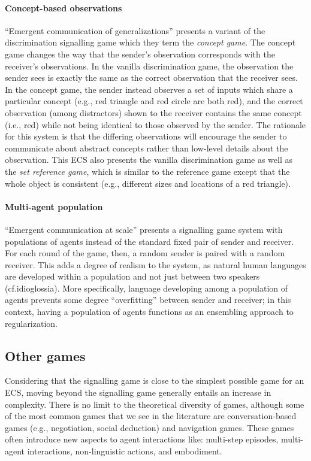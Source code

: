 \paragraph{Concept-based observations}
``Emergent communication of generalizations'' \citep[MIT license]{mu2021generalizations} presents a variant of the discrimination signalling game which they term the \emph{concept game}.
The concept game changes the way that the sender's observation corresponds with the receiver's observations.
In the vanilla discrimination game, the observation the sender sees is exactly the same as the correct observation that the receiver sees.
In the concept game, the sender instead observes a set of inputs which share a particular concept (e.g., red triangle and red circle are both red), and the correct observation (among distractors) shown to the receiver contains the same concept (i.e., red) while not being identical to those observed by the sender.
The rationale for this system is that the differing observations will encourage the sender to communicate about abstract concepts rather than low-level details about the observation.
This ECS also presents the vanilla discrimination game as well as the \emph{set reference game}, which is similar to the reference game except that the whole object is consistent (e.g., different sizes and locations of a red triangle).

\paragraph{Multi-agent population}
``Emergent communication at scale'' \citep[Apache 2.0-license]{chaabouni2022emergent} presents a signalling game system with populations of agents instead of the standard fixed pair of sender and receiver.
For each round of the game, then, a random sender is paired with a random receiver.
This adds a degree of realism to the system, as natural human languages are developed within a population and not just between two speakers (cf.\@ idioglossia).
More specifically, language developing among a population of agents prevents some degree ``overfitting'' between sender and receiver;
  in this context, having a population of agents functions as an ensembling approach to regularization.

\subsection{Other games}
\unskip\label{elcc:sec:other-games}
Considering that the signalling game is close to the simplest possible game for an ECS, moving beyond the signalling game generally entails an increase in complexity.
There is no limit to the theoretical diversity of games, although some of the most common games that we see in the literature are
  conversation-based games (e.g., negotiation, social deduction) and navigation games.
These games often introduce new aspects to agent interactions like:
  multi-step episodes,
  multi-agent interactions,
  non-linguistic actions,
  and embodiment.

